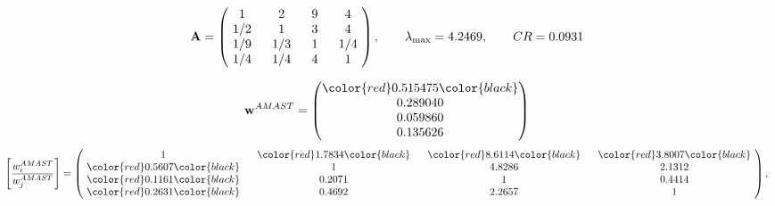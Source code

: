 \begin{example}
\begin{equation*}
\mathbf{A} =
\begin{pmatrix}
$\,\,$ 1 $\,\,$ & $\,\,$2$\,\,$ & $\,\,$9$\,\,$ & $\,\,$4 $\,\,$ \\
$\,\,$ 1/2$\,\,$ & $\,\,$ 1 $\,\,$ & $\,\,$3$\,\,$ & $\,\,$4 $\,\,$ \\
$\,\,$ 1/9$\,\,$ & $\,\,$ 1/3$\,\,$ & $\,\,$ 1 $\,\,$ & $\,\,$ 1/4 $\,\,$ \\
$\,\,$ 1/4$\,\,$ & $\,\,$ 1/4$\,\,$ & $\,\,$4$\,\,$ & $\,\,$ 1  $\,\,$ \\
\end{pmatrix},
\qquad
\lambda_{\max} =
4.2469,
\qquad
CR = 0.0931
\end{equation*}

\begin{equation*}
\mathbf{w}^{AMAST} =
\begin{pmatrix}
\color{red} 0.515475\color{black} \\
0.289040\\
0.059860\\
0.135626
\end{pmatrix}\end{equation*}
\begin{equation*}
\left[ \frac{{w}^{AMAST}_i}{{w}^{AMAST}_j} \right] =
\begin{pmatrix}
$\,\,$ 1 $\,\,$ & $\,\,$\color{red} 1.7834\color{black} $\,\,$ & $\,\,$\color{red} 8.6114\color{black} $\,\,$ & $\,\,$\color{red} 3.8007\color{black} $\,\,$ \\
$\,\,$\color{red} 0.5607\color{black} $\,\,$ & $\,\,$ 1 $\,\,$ & $\,\,$4.8286$\,\,$ & $\,\,$2.1312  $\,\,$ \\
$\,\,$\color{red} 0.1161\color{black} $\,\,$ & $\,\,$0.2071$\,\,$ & $\,\,$ 1 $\,\,$ & $\,\,$0.4414 $\,\,$ \\
$\,\,$\color{red} 0.2631\color{black} $\,\,$ & $\,\,$0.4692$\,\,$ & $\,\,$2.2657$\,\,$ & $\,\,$ 1  $\,\,$ \\
\end{pmatrix},
\end{equation*}


\end{example}

